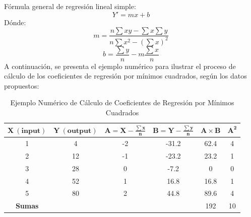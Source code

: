 \documentclass[12pt]{article}
\begin{document}
        \vspace{0.5em}
        \noindent
        Fórmula general de regresión lineal simple:
        \[
         Y' = mx + b 
        \]
        \noindent
        Dónde:
        \[
        m = \frac{n \sum xy - \sum x \sum y}{n \sum x^{2} - (\sum x)^2}
        \]
        \[
        b = \frac{\sum y}{n} - m \frac{\sum x}{n}
        \]
        \noindent
        A continuación, se presenta el ejemplo numérico para ilustrar el proceso de cálculo de los coeficientes de regresión por mínimos cuadrados, según los datos propuestos:
        
        \begin{table}[!h]
                \caption{Ejemplo Numérico de Cálculo de Coeficientes de Regresión por Mínimos Cuadrados}
                \begin{center}
                        \begin{tabular}{|c|c|c|c|c|c|}
                                \hline
                                $\mathbf{X\ (input)}$\rule{0pt}{20pt} &
                                $\mathbf{Y\ (output)}$\rule{0pt}{20pt} &
                                $\mathbf{A = X - \frac{\sum x}{n}}$\rule{0pt}{20pt} &
                                $\mathbf{B = Y - \frac{\sum y}{n}}$\rule{0pt}{20pt} &
                                $\mathbf{A \times B}$\rule{0pt}{20pt} &
                                $\mathbf{A^2}$\rule{0pt}{20pt} \\
                                \hline
                                1 & 4 & -2 & -31.2 & 62.4  & 4\\
                                \hline
                                2 & 12 & -1 & -23.2 & 23.2  & 1\\
                                \hline
                                3 & 28 & 0 & -7.2 & 0 & 0\\
                                \hline
                                4 & 52 & 1 & 16.8 & 16.8  & 1\\
                                \hline
                                5 & 80 & 2 & 44.8 & 89.6  & 4\\
                                \hline
                                \textbf{Sumas} &  &  &  & 192 & 10\\
                                \hline
                        \end{tabular}
                        \label{tab:ejemplo}
                \end{center}
        \end{table}
        
\end{document}
